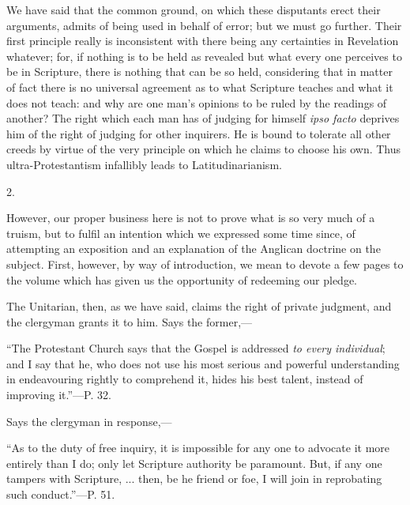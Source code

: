We have said that the common ground, on which
these disputants erect their arguments, admits of being used in behalf
of error; but we must go further. Their first principle really
is inconsistent with there being any certainties in Revelation
whatever; for, if nothing is to be held as revealed but what every one
perceives to be in Scripture, there is nothing that can be so held,
considering that in matter of fact there is no universal agreement as
to what Scripture teaches and what it does not teach: and why are one
man's opinions to be ruled by the readings of another? The right which
each man has of judging for himself \emph{ipso facto} deprives him of
the right of judging for other inquirers. He is bound to tolerate all
other creeds by virtue of the very principle on which he claims to
choose his own. Thus ultra-Protestantism infallibly leads to
Latitudinarianism.

2.

However, our proper business here is not to prove
what is so very much of a truism, but to fulfil an intention which we
expressed some time since, of attempting an exposition and an
explanation of the Anglican doctrine on the subject. First, however,
by way of introduction, we mean to devote a few pages to the volume
which has given us the opportunity of redeeming our pledge.

The Unitarian, then, as we have said, claims the
right of private judgment, and the clergyman grants it to him. Says
the former,—

``The
Protestant Church says that the Gospel is addressed \emph{to every
individual}; and I say that he, who does not use his most serious
and powerful understanding in endeavouring rightly to comprehend it,
hides his best talent, instead of improving it.''—P. 32.

Says the clergyman in response,—

``As
to the duty of free inquiry, it is impossible for any one to advocate
it more entirely than I do; only let Scripture authority be
paramount. But, if any one tampers with Scripture, ... then, be he
friend or foe, I will join in reprobating such conduct.''—P. 51.

